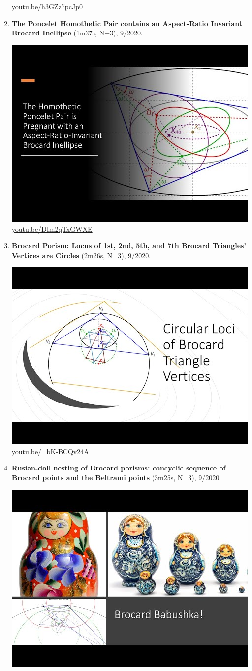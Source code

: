 \documentclass[12pt]{amsart}
\begin{document}
\begin{enumerate}[resume]
\begin{center}
\href{https://youtu.be/h3GZz7pcJp0}{\url{youtu.be/h3GZz7pcJp0}}\end{center}
% 
\item \textbf{The Poncelet Homothetic Pair contains an Aspect-Ratio Invariant Brocard Inellipse} (1m37s, N=3), 9/2020. 
\begin{center}\includegraphics[width=.5\textwidth]{pics/DIm2qTxGWXE.jpg} \\ 
\href{https://youtu.be/DIm2qTxGWXE}{\url{youtu.be/DIm2qTxGWXE}}\end{center}
% 
\item \textbf{Brocard Porism: Locus of 1st, 2nd, 5th, and 7th Brocard Triangles' Vertices are Circles} (2m26s, N=3), 9/2020. 
\begin{center}\includegraphics[width=.5\textwidth]{pics/_bK-BCQv24A.jpg} \\ 
\href{https://youtu.be/_bK-BCQv24A}{\url{youtu.be/\_bK-BCQv24A}}\end{center}
% 
\item \textbf{Rusian-doll nesting of Brocard porisms: concyclic sequence of Brocard points and the Beltrami points} (3m25s, N=3), 9/2020. 
\begin{center}\includegraphics[width=.5\textwidth]{pics/Z3YlEbCFbnA.jpg} \\ 

\end{center}
\end{enumerate}
\end{document}
